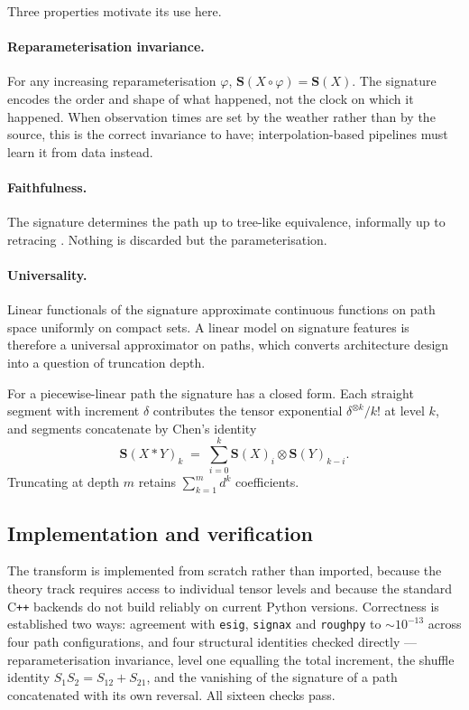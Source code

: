 \documentclass[11pt,a4paper]{report}
\newcommand{\sig}{\mathbf{S}}
\begin{document}
Three properties motivate its use here.

\paragraph{Reparameterisation invariance.} For any increasing reparameterisation
$\varphi$, $\sig(X \circ \varphi) = \sig(X)$. The signature encodes the order and shape of
what happened, not the clock on which it happened. When observation times are set by the
weather rather than by the source, this is the correct invariance to have; interpolation-based
pipelines must learn it from data instead.

\paragraph{Faithfulness.} The signature determines the path up to tree-like equivalence,
informally up to retracing \cite{hambly}. Nothing is discarded but the parameterisation.

\paragraph{Universality.} Linear functionals of the signature approximate continuous functions
on path space uniformly on compact sets. A linear model on signature features is therefore a
universal approximator on paths, which converts architecture design into a question of
truncation depth.

For a piecewise-linear path the signature has a closed form. Each straight segment with
increment $\delta$ contributes the tensor exponential $\delta^{\otimes k} / k!$ at level $k$,
and segments concatenate by Chen's identity
\[
\sig(X * Y)_k \;=\; \sum_{i=0}^{k} \sig(X)_i \otimes \sig(Y)_{k-i}.
\]
Truncating at depth $m$ retains $\sum_{k=1}^{m} d^k$ coefficients.

\subsection{Implementation and verification}

The transform is implemented from scratch rather than imported, because the theory track
requires access to individual tensor levels and because the standard C\texttt{++} backends do
not build reliably on current Python versions. Correctness is established two ways: agreement
with \texttt{esig}, \texttt{signax} and \texttt{roughpy} to $\sim10^{-13}$ across four path
configurations, and four structural identities checked directly --- reparameterisation
invariance, level one equalling the total increment, the shuffle identity
$S_1 S_2 = S_{12} + S_{21}$, and the vanishing of the signature of a path concatenated with
its own reversal. All sixteen checks pass.
\end{document}
